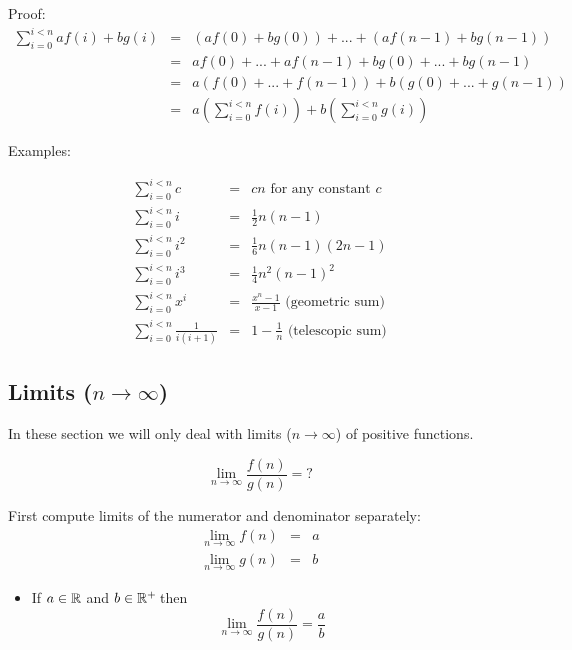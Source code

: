 \documentclass[justified,sixbynine]{tufte-book}
\theoremstyle{plain}%
\theoremstyle{definition}
\theoremstyle{remark}
\begin{document}
\begin{fullwidth}
Proof:
\begin{eqnarray}
\sum_{i=0}^{i<n}af(i)+bg(i) &=&\left( af(0)+bg(0)\right) +...+\left(
af(n-1)+bg(n-1)\right)  \nonumber \\
&=&af(0)+...+af(n-1)+bg(0)+...+bg(n-1)  \nonumber \\
&=&a\left( f(0)+...+f(n-1)\right) +b\left( g(0)+...+g(n-1)\right)  \nonumber
\\
&=&a\left( \sum_{i=0}^{i<n}f(i)\right) +b\left( \sum_{i=0}^{i<n}g(i)\right)
\end{eqnarray}

Examples:

\begin{eqnarray}
\sum_{i=0}^{i<n}c &=&cn\text{ for any constant }c \\
\sum_{i=0}^{i<n}i &=&\frac 12n(n-1) \\
\sum_{i=0}^{i<n}i^2 &=&\frac 16n(n-1)(2n-1) \\
\sum_{i=0}^{i<n}i^3 &=&\frac 14n^2(n-1)^2 \\
\sum_{i=0}^{i<n}x^i &=&\frac{x^n-1}{x-1}\text{ (geometric sum)} \\
\sum_{i=0}^{i<n}\frac 1{i(i+1)} &=&1-\frac 1n\text{ (telescopic sum)}
\end{eqnarray}


\goodbreak\subsection{Limits ($n\rightarrow \infty $)}

In these section we will only deal with limits ($n\rightarrow \infty $) of
positive functions.

\begin{equation}
\lim_{n\rightarrow \infty }\frac{f(n)}{g(n)}=?
\end{equation}

First compute limits of the numerator and denominator separately:
\begin{eqnarray}
\lim_{n\rightarrow \infty }f(n) &=&a \\
\lim_{n\rightarrow \infty }g(n) &=&b
\end{eqnarray}

\begin{itemize}
\item  If $a\in {\Bbb R}$ and $b\in {\Bbb R}^{+}\,$then
\begin{equation}
\lim_{n\rightarrow \infty }\frac{f(n)}{g(n)}=\frac ab
\end{equation}


\end{itemize}
\end{fullwidth}
\end{document}

